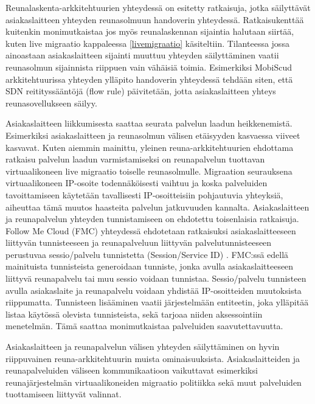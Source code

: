 Reunalaskenta-arkkitehtuurien yhteydessä on esitetty ratkaisuja, jotka säilyttävät asiakaslaitteen yhteyden reunasolmuun handoverin yhteydessä. Ratkaisukenttää kuitenkin monimutkaistaa jos myös reunalaskennan sijaintia halutaan siirtää, kuten live migraatio kappaleessa \ref{livemigraatio} käsiteltiin.
Tilanteessa jossa ainoastaan asiakaslaitteen sijainti muuttuu yhteyden säilyttäminen vaatii reunasolmun sijainnista riippuen vain vähäisiä toimia. Esimerkiksi MobiScud arkkitehtuurissa yhteyden ylläpito handoverin yhteydessä tehdään siten, että SDN reitityssääntöjä (flow rule) päivitetään, jotta asiakaslaitteen yhteys reunasovellukseen säilyy. 

Asiakaslaitteen liikkumisesta saattaa seurata palvelun laadun heikkenemistä. Esimerkiksi asiakaslaitteen ja reunasolmun välisen etäisyyden kasvaessa viiveet kasvavat.
Kuten aiemmin mainittu, yleinen reuna-arkkitehtuurien ehdottama ratkaisu palvelun laadun varmistamiseksi on reunapalvelun tuottavan virtuaalikoneen live migraatio toiselle reunasolmulle.
Migraation seurauksena virtuaalikoneen IP-osoite todennäköisesti vaihtuu ja koska palveluiden tavoittamiseen käytetään tavallisesti IP-osoitteisiin pohjautuvia yhteyksiä, aiheuttaa tämä muutos haasteita palvelun jatkuvuuden kannalta.
Asiakaslaitteen ja reunapalvelun yhteyden tunnistamiseen on ehdotettu toisenlaisia ratkaisuja.
Follow Me Cloud (FMC) yhteydessä ehdotetaan ratkaisuksi asiakaslaitteeseen liittyvän tunnisteeseen ja reunapalveluun liittyvän palvelutunnisteeseen perustuvaa sessio/palvelu tunnistetta (Session/Service ID) \cite{taleb2013follow}.
FMC:ssä edellä mainituista tunnisteista generoidaan tunniste, jonka avulla asiakaslaitteeseen liittyvä reunapalvelu tai muu sessio voidaan tunnistaa.
Sessio/palvelu tunnisteen avulla asiakaslaite ja reunapalvelu voidaan yhdistää IP-osoitteiden muutoksista riippumatta.
Tunnisteen lisääminen vaatii järjestelmään entiteetin, joka ylläpitää listaa käytössä olevista tunnisteista, sekä tarjoaa niiden aksessointiin menetelmän. Tämä saattaa monimutkaistaa palveluiden saavutettavuutta. 

Asiakaslaitteen ja reunapalvelun välisen yhteyden säilyttäminen on hyvin riippuvainen reuna-arkkitehtuurin muista ominaisuuksista. Asiakaslaitteiden ja reunapalveluiden väliseen kommunikaatioon vaikuttavat esimerkiksi reunajärjestelmän virtuaalikoneiden migraatio politiikka sekä muut palveluiden tuottamiseen liittyvät valinnat.








